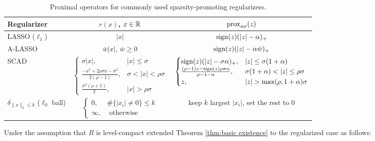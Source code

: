 \begin{table}[H]
\small
    \centering
    \begin{tabular}{|p{25.4mm}|c|c|}
        \hline
         \!\!Regularizer & $r(x)$, $x \in \operatorname{\mathbb{R}}$ & ${\mathrm{prox}}_{\alpha r}(z)  $ \\
         \hline \hline
         LASSO ($\ell_1$) \newline & $|x|$ & $\operatorname*{\mathrm{sign}}(z)(|z| - \alpha)_+$ \\
         \hline
         A-LASSO \newline  & $\bar{w}|x|$, $\bar{w} \geq 0$ &  $\operatorname*{\mathrm{sign}}(z)(|z| - \alpha\bar{w})_+$\\
         \hline
         SCAD \newline & $\begin{cases} \sigma |x|, & |x| \leq \sigma \\ \frac{-x^2 + 2\rho\sigma x - \sigma^2}{2(\rho - 1)}, & \sigma < |x| < \rho\sigma \\ \frac{\sigma^2(\rho + 1)}{2}, & |x| > \rho\sigma \end{cases}$ & $\begin{cases} \operatorname*{\mathrm{sign}}(z)(|z| - \sigma\alpha)_+, & |z| \leq \sigma(1+\alpha) \\ \frac{(\rho - 1)z - \operatorname*{\mathrm{sign}}(z)\rho \sigma\alpha}{\rho - 1 - \alpha}, & \sigma(1+\alpha) < |z| \leq \rho\sigma
         \\ z, & |z| > \max(\rho,1+\alpha)\sigma \end{cases}$ \\
         \hline
         $\delta_{\|x\|_0 \leq k}$  \newline ($\ell_0$ ball) & $\begin{cases} 0, & \#\{|x_i| \neq 0\} \leq k\\ \infty, & \text{ otherwise}\end{cases}$ & keep $k$ largest $|x_i|$, set the rest to 0 \\
         \hline
    \end{tabular}
    \caption{Proximal operators for commonly used sparsity-promoting regularizers. }
    \label{table:proxes}
\end{table}

Under the assumption that $R$ is level-compact \cite{aravkin2022jimtheory} extended Theorem \ref{thm:basic existence} to the regularized case as follows:

